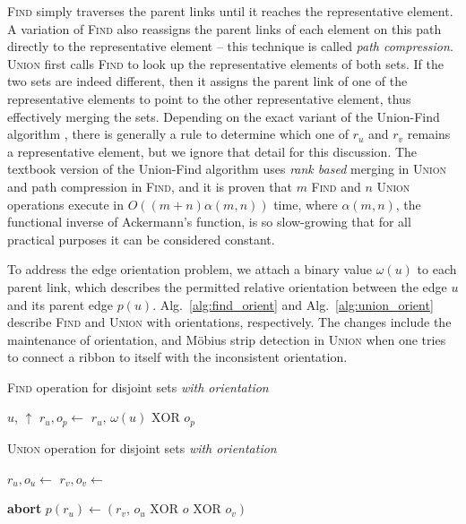 \documentclass[oneeqnum,onethmnum,onefignum,onetabnum]{siamltex1213}
\begin{document}
\textsc{Find} simply traverses the parent links until it reaches the
representative element.  A variation of \textsc{Find} also reassigns the parent
links of each element on this path directly to the representative element --
this technique is called \emph{path compression}.
\textsc{Union} first calls \textsc{Find} to look up the representative elements
of both sets. If the two sets are indeed different, then it assigns the
parent link of one of the representative elements to point to the other
representative element, thus effectively merging the sets.
Depending on the exact variant of the Union-Find algorithm \cite{Patwary2010},
there is generally a rule to determine which one of $ r_u $ and $ r_v $ remains
a representative element, but we ignore that detail for this discussion.
The textbook version of the Union-Find algorithm \cite{tarjan1975efficiency}
uses \emph{rank based} merging in \textsc{Union} and path compression in
\textsc{Find}, and it is proven that $ m $ \textsc{Find} and $ n $
\textsc{Union} operations execute in $ O( (m + n) \alpha(m, n) ) $ time, where
$ \alpha(m, n) $, the functional inverse of Ackermann's function, is so
slow-growing that for all practical purposes it can be considered constant.

To address the edge orientation problem, we attach a binary value
$ \omega(u) $ to each parent link, which describes the
permitted relative orientation between the edge $ u $ and its parent
edge $ p(u) $.  Alg.~\ref{alg:find_orient} and
Alg.~\ref{alg:union_orient} describe \textsc{Find} and \textsc{Union}
with orientations, respectively.
The changes include the maintenance of orientation, and Möbius strip
detection in \textsc{Union} when one tries to connect a ribbon to
itself with the inconsistent orientation.

\begin{algorithm}
  \caption{\textsc{Find} operation for disjoint sets \emph{with orientation}}
  \label{alg:find_orient}
  \begin{algorithmic}[1]
      \State \Return $ u $, $ \uparrow $
    \Else
      \State $ r_u, o_p \gets $ 
      \State \Return $ r_u, \, \omega(u) \text{ XOR } o_p $
    \EndIf
    \EndFunction
  \end{algorithmic}
\end{algorithm}

\begin{algorithm}
  \caption{\textsc{Union} operation for disjoint sets \emph{with orientation}}
  \label{alg:union_orient}
  \begin{algorithmic}[1]
    \State $ r_u, o_u \gets $ 
    \State $ r_v, o_v \gets $ 

        \State \textbf{abort}
      \EndIf
    \Else
      \State $ p(r_u) \gets (r_v, \, o_u \text{ XOR } o \text{ XOR } o_v ) $
    \EndIf
    \EndProcedure
  \end{algorithmic}
\end{algorithm}
\end{document}
